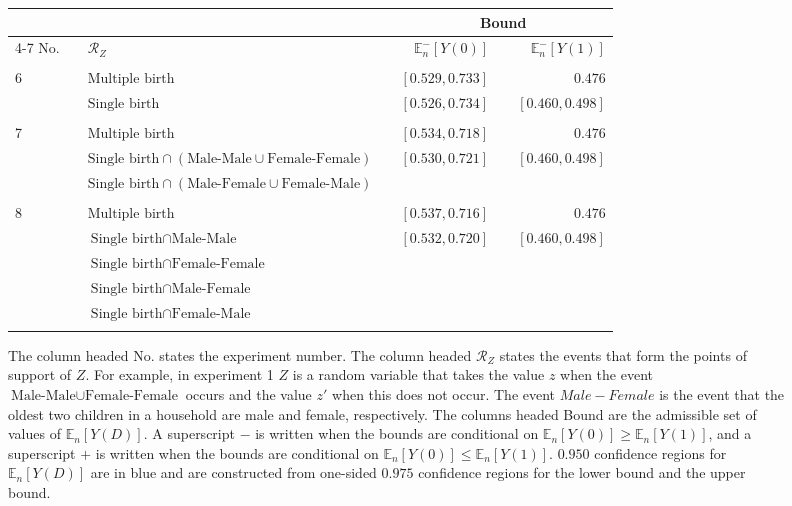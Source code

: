 \documentclass[10pt,a4paper,twoside]{article}
\numberwithin{equation}{section}
\begin{document}
\begin{sidewaystable}[p]
\centering
\caption{$\mathcal{R}_Z$ and admissible sets of values of $\mathbb{E}_n[Y(d)]$.}
\centering
\begin{subfigure}{\textwidth}
\centering
\begin{tabular}{lclcrcr}
\toprule
&	&  & &\multicolumn{3}{c}{Bound} \\
\cmidrule(r){4-7}	
No. & &	$\mathcal{R}_Z$	&	&	$\mathbb{E}_n^-[Y(0)]$	&	&	$\mathbb{E}_n^-[Y(1)]$\\
\midrule
& &\phantom{$\text{Male-Female}\cup\text{Female-Male}\cup\text{Female-Female}$}\\
6& &$\text{Multiple birth}$&	&	$[0.529,0.733]$	&	&	$0.476$\\
& &$\text{Single birth}$& &\color{blue}$[0.526,0.734]$	&	&	\color{blue}$[0.460,0.498]$\\
\\
7& &$\text{Multiple birth}$&	&	$[0.534,0.718]$	&	&	$0.476$\\
& &$\text{Single birth}\cap(\text{Male-Male}\cup\text{Female-Female})$& &\color{blue}$[0.530,0.721]$	&	&	\color{blue}$[0.460,0.498]$\\
& &$\text{Single birth}\cap(\text{Male-Female}\cup\text{Female-Male})$\\
\\
8& &$\text{Multiple birth}$&	&	$[0.537,0.716]$	&	&	$0.476$\\
& &$\text{Single birth}\cap\text{Male-Male}$& &\color{blue}$[0.532,0.720]$	&	&	\color{blue}$[0.460,0.498]$\\
& &$\text{Single birth}\cap\text{Female-Female}$\\
& &$\text{Single birth}\cap\text{Male-Female}$ \\
& &$\text{Single birth}\cap\text{Female-Male}$\\
	\\
\bottomrule
\end{tabular}
\vspace{10pt}
\caption{The column headed No. states the experiment number. The column headed $\mathcal{R}_Z$ states the events that form the points of support of $Z$. For example, in experiment 1 $Z$ is a random variable that takes the value $z$ when the event $\text{Male-Male}\cup\text{Female-Female}$ occurs and the value $z'$ when this does not occur. The event $Male-Female$ is the event that the oldest two children in a household are male and female, respectively. The columns headed Bound are the admissible set of values of $\mathbb{E}_n[Y(D)]$. A superscript $-$ is written when the bounds are conditional on $\mathbb{E}_n[Y(0)]\geq\mathbb{E}_n[Y(1)]$, and a superscript $+$ is written when the bounds are conditional on $\mathbb{E}_n[Y(0)]\leq\mathbb{E}_n[Y(1)]$. $0.950$ confidence regions for $\mathbb{E}_n[Y(D)]$ are in blue and are constructed from one-sided $0.975$ confidence regions for the lower bound and the upper bound.}
\end{subfigure}
\label{tbl:setsmult}
\end{sidewaystable}
\end{document}
